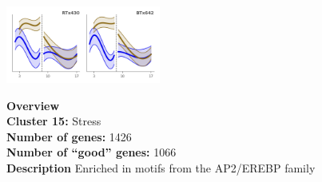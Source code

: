 \begin{multicols}{2}
\includegraphics[width=2in]{figures/clusters/root_Preflowering_14.png}
\columnbreak

\noindent \textbf{Overview}\\\textbf{Cluster 15:} Stress \\
\textbf{Number of genes:} 1426 \\
\textbf{Number of ``good'' genes:} 1066 \\
\textbf{Description} Enriched in motifs from the AP2/EREBP family \\
\end{multicols}

